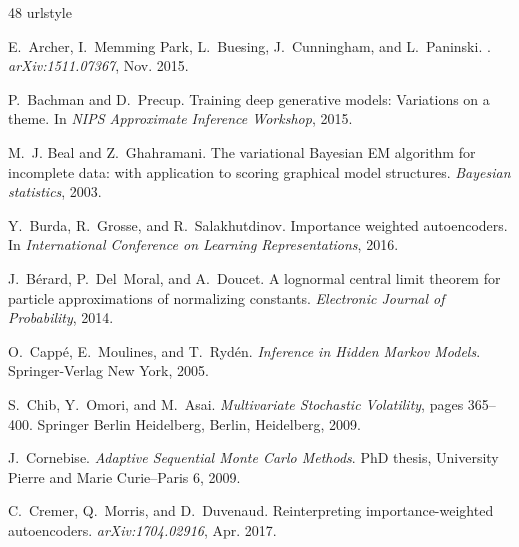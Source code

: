 \begin{thebibliography}{48}
\providecommand{\natexlab}[1]{#1}
\providecommand{\url}[1]{\texttt{#1}}
\expandafter\ifx\csname urlstyle\endcsname\relax
  \providecommand{\doi}[1]{doi: #1}\else
  \providecommand{\doi}{doi: \begingroup \urlstyle{rm}\Url}\fi

E.~{Archer}, I.~{Memming Park}, L.~{Buesing}, J.~{Cunningham}, and
  L.~{Paninski}.
.
\newblock \emph{arXiv:1511.07367}, Nov. 2015.

P.~Bachman and D.~Precup.
\newblock Training deep generative models: Variations on a theme.
\newblock In \emph{NIPS Approximate Inference Workshop}, 2015.

M.~J. Beal and Z.~Ghahramani.
\newblock The variational {B}ayesian {EM} algorithm for incomplete data: with
  application to scoring graphical model structures.
\newblock \emph{Bayesian statistics}, 2003.

Y.~Burda, R.~Grosse, and R.~Salakhutdinov.
\newblock Importance weighted autoencoders.
\newblock In \emph{International Conference on Learning Representations}, 2016.

J.~Bérard, P.~Del~Moral, and A.~Doucet.
\newblock A lognormal central limit theorem for particle approximations of
  normalizing constants.
\newblock \emph{Electronic Journal of Probability}, 2014.

O.~Capp\'e, E.~Moulines, and T.~Ryd\'en.
\newblock \emph{Inference in Hidden {M}arkov Models}.
\newblock Springer-Verlag New York, 2005.

S.~Chib, Y.~Omori, and M.~Asai.
\newblock \emph{Multivariate Stochastic Volatility}, pages 365--400.
\newblock Springer Berlin Heidelberg, Berlin, Heidelberg, 2009.

J.~Cornebise.
\newblock \emph{Adaptive Sequential Monte Carlo Methods}.
\newblock PhD thesis, University Pierre and Marie Curie–Paris 6, 2009.

C.~{Cremer}, Q.~{Morris}, and D.~{Duvenaud}.
\newblock Reinterpreting importance-weighted autoencoders.
\newblock \emph{arXiv:1704.02916}, Apr. 2017.


\end{thebibliography}
